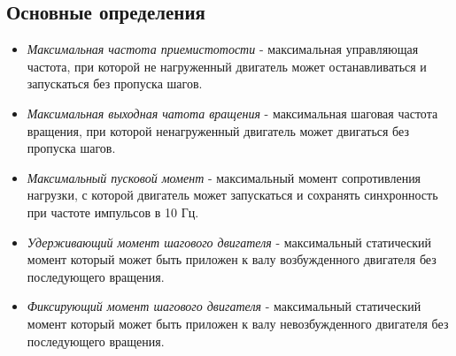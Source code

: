 \subsection{ Основные определения }
\begin{itemize}
    \item \textit{Максимальная частота приемистотости} - максимальная управляющая частота,
    при которой не нагруженный двигатель может останавливаться и запускаться без пропуска шагов.

    \item \textit{Максимальная выходная чатота вращения} - максимальная шаговая частота вращения,
    при которой ненагруженный двигатель может двигаться без пропуска шагов.

    \item \textit{Максимальный пусковой момент} - максимальный момент сопротивления нагрузки,
    с которой двигатель может запускаться и сохранять синхронность при частоте импульсов в 10 Гц.

    \item \textit{Удерживающий момент шагового двигателя} - максимальный статический момент
    который может быть приложен к валу возбужденного двигателя без последующего вращения.

    \item \textit{Фиксирующий момент шагового двигателя} - максимальный статический момент
    который может быть приложен к валу невозбужденного двигателя без последующего вращения.
\end{itemize}

